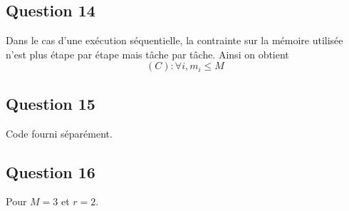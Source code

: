 \documentclass[11pt]{article}
\begin{document}
  \subsection{Question 14}
    Dans le cas d'une exécution séquentielle, la contrainte sur la mémoire
    utilisée n'est plus étape par étape mais tâche par tâche. Ainsi on obtient
    \[ (C): \forall i, m_i \leq M \]

  \subsection{Question 15}
    Code fourni séparément.

  \subsection{Question 16}
    Pour $M=3$ et $r=2$.
\end{document}
